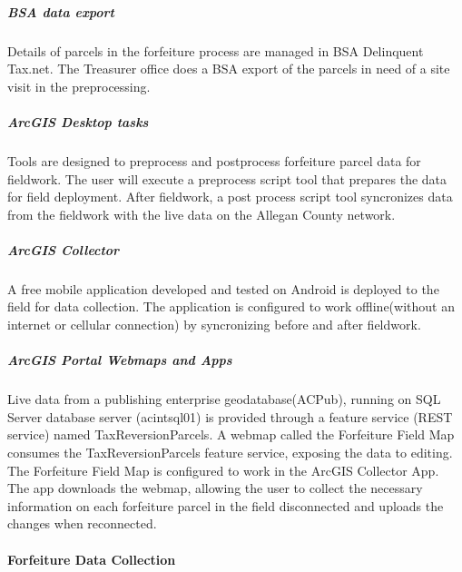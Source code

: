 \documentclass[class=article , crop=false, titlepage, twoside, multi={itemize, figure, verbatim}, float=false]{standalone}
\begin{document}
\subparagraph{BSA data export}Details of parcels in the forfeiture process are managed in BSA Delinquent Tax.net.  The Treasurer office does a BSA export of the parcels in need of a site visit in the preprocessing.

\subparagraph{ArcGIS Desktop tasks}Tools are designed to preprocess and postprocess forfeiture parcel data for fieldwork.  The user will execute a preprocess script tool that prepares the data for field deployment.  After fieldwork, a post process script tool syncronizes data from the fieldwork with the live data on the Allegan County network. 

\subparagraph{ArcGIS Collector}A free mobile application developed and tested on Android is deployed to the field for data collection.  The application is configured to work offline(without an internet or cellular connection) by syncronizing before and after fieldwork.

\subparagraph{ArcGIS Portal Webmaps and Apps}Live data from a publishing enterprise geodatabase(ACPub), running on SQL Server database server (acintsql01) is provided through a feature service (REST service)  named TaxReversionParcels.  A webmap called the Forfeiture Field Map consumes the TaxReversionParcels feature service, exposing the data to editing.  The Forfeiture Field Map is configured to work in the ArcGIS Collector App.  The app downloads the webmap, allowing the user to collect the necessary information on each forfeiture parcel in the field disconnected and uploads the changes when reconnected. 

\paragraph{Forfeiture Data Collection}
\end{document}
